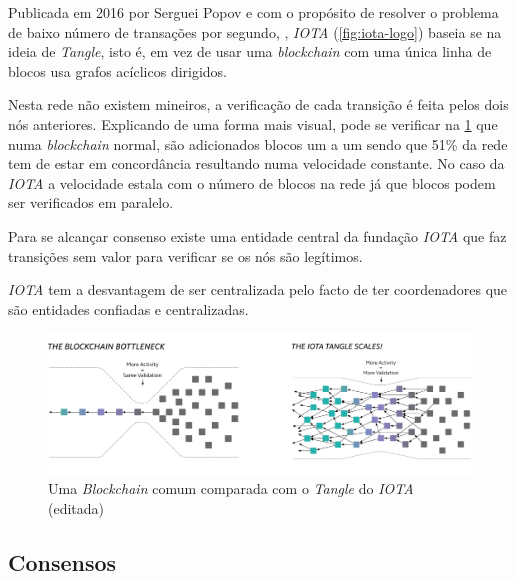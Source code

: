 Publicada em 2016 por Serguei Popov e com o propósito de resolver o problema de baixo número de transações por segundo, \cite{iota_wiki} , \textit{IOTA}  (\cref{fig:iota-logo}) baseia se na ideia de \textit{Tangle}, isto é, em vez de usar uma \textit{blockchain} com uma única linha de blocos usa grafos acíclicos dirigidos.

Nesta rede não existem mineiros, a verificação de cada transição é feita
pelos dois nós anteriores. \cite{directed_acyclic_graph} Explicando de uma forma mais visual, pode se verificar na \cref{fig:linevsdag} que numa \textit{blockchain} normal, são adicionados blocos um a um sendo que 51\% da rede tem de estar em concordância resultando numa velocidade constante. No caso da \textit{IOTA} a velocidade estala com o número de blocos na rede já que blocos podem ser verificados em paralelo.


Para se alcançar consenso existe uma entidade central da fundação \textit{IOTA} que faz transições sem valor para verificar se os nós são legítimos.

\textit{IOTA} tem a desvantagem de ser centralizada pelo facto de ter
coordenadores que são entidades confiadas e centralizadas.

\begin{figure}[!ht]
    \centering
    \includegraphics[width=\textwidth]{images/linevsdag.png}
    \caption{Uma \textit{Blockchain} comum comparada com o \textit{Tangle} do \textit{IOTA} (editada) \cite{iota_wiki}}
    \label{fig:linevsdag}
\end{figure}

\newpage
\subsection{Consensos}
\label{concenso}

 \cite{consensus_wiki}

